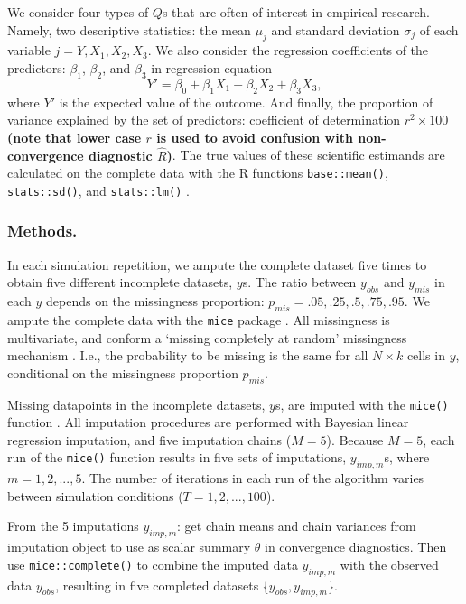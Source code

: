 \documentclass[Royal,times,sageh]{sagej}
\begin{document}
We consider four types of \(Q\)s that are often of interest in empirical
research. Namely, two descriptive statistics: the mean \(\mu_j\) and
standard deviation \(\sigma_j\) of each variable
\(j = Y, X_1, X_2, X_3\). We also consider the regression coefficients
of the predictors: \(\beta_1\), \(\beta_2\), and \(\beta_3\) in
regression equation
\[Y' = \beta_0 + \beta_1 X_1 + \beta_2 X_2 + \beta_3 X_3,\] where \(Y'\)
is the expected value of the outcome. And finally, the proportion of
variance explained by the set of predictors: coefficient of
determination \(r^2 \times 100\) \textbf{(note that lower case \(r\) is
used to avoid confusion with non-convergence diagnostic
\(\widehat{R}\))}. The true values of these scientific estimands are
calculated on the complete data with the R functions
\texttt{base::mean()}, \texttt{stats::sd()}, and \texttt{stats::lm()}
\citep{R}.

\hypertarget{methods.}{%
\subsubsection{Methods.}\label{methods.}}

In each simulation repetition, we ampute the complete dataset five times
to obtain five different incomplete datasets, \(y\)s. The ratio between
\(y_{obs}\) and \(y_{mis}\) in each \(y\) depends on the missingness
proportion: \(p_{mis} =.05,.25,.5,.75,.95\). We ampute the complete data
with the \texttt{mice} package \citep[function
\texttt{mice::ampute()};][]{mice}. All missingness is multivariate, and
conform a `missing completely at random' missingness mechanism
\citep{rubin87}. I.e., the probability to be missing is the same for all
\(N \times k\) cells in \(y\), conditional on the missingness proportion
\(p_{mis}\).

Missing datapoints in the incomplete datasets, \(y\)s, are imputed with
the \texttt{mice()} function \citep{mice}. All imputation procedures are
performed with Bayesian linear regression imputation, and five
imputation chains (\(M=5\)). Because \(M=5\), each run of the
\texttt{mice()} function results in five sets of imputations,
\(y_{imp,m}\)s, where \(m = 1, 2, ..., 5\). The number of iterations in
each run of the algorithm varies between simulation conditions
(\(T=1,2,...,100\)).

From the 5 imputations \(y_{imp,m}\): get chain means and chain
variances from imputation object to use as scalar summary \(\theta\) in
convergence diagnostics. Then use \texttt{mice::complete()} to combine
the imputed data \(y_{imp,m}\) with the observed data \(y_{obs}\),
resulting in five completed datasets \{\(y_{obs}, y_{imp, m}\)\}.
\end{document}
